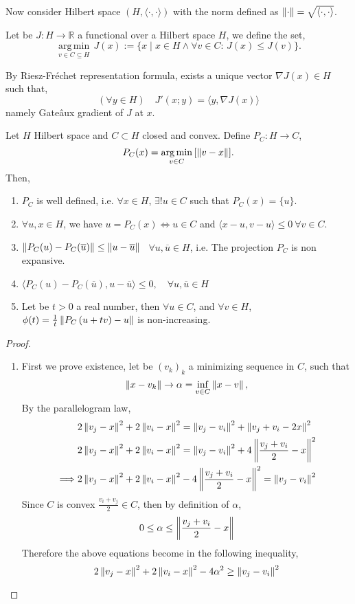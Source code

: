 Now consider Hilbert space $(H, \langle \cdot,\cdot \rangle)$ with the norm defined as $\left\lVert\cdot\right\rVert=\sqrt{\langle\cdot,\cdot\rangle}$.

Let be $J: H\rightarrow \mathbb{R}$ a functional over a Hilbert space $H$, we define the set,
\[
{\displaystyle {\underset {v\in C\subseteq H}{\operatorname {arg\,min} }}\,J(x):=\{x\mid x\in H \wedge \forall v\in C:\,J(x)\leq J(v)\}.}\]


By Riesz-Fr\'echet representation formula, exists a unique vector $\nabla J(x) \in H$ such that, 
\[
(\forall y \in H) \quad J'(x; y)=\langle y, \nabla J(x)\rangle
\]
namely Gate\^aux gradient of $J$ at $x$. 

\begin{lemma}
\label{lemma3. Projection}
Let $H$ Hilbert space and $C\subset H$ closed and convex. Define $P_C: H\rightarrow C$, \[P_C(x)={\displaystyle {\underset {v\in C}{\operatorname {arg\,min} }}\left[\left\lVert v-x\right\rVert\right]}.\]
Then,
\begin{enumerate}
	\item $P_C$ is well defined, i.e.  $\forall x \in H $, $\exists !u \in C$ such that $P_C(x)=\{u\}$.
	\item $\forall u,x\in H$, we have $u=P_C(x) \iff u\in C$  and  $\langle x-u, v-u\rangle\leq 0\ \forall v \in C$.
	\item $\left\lVert P_C(u)-P_C(\overline{u})\right\rVert\leq \left\lVert u-\overline{u}\right\rVert$ \ $\forall u, \overline{u} \in H$, i.e. The projection $P_C$ is non expansive.
	\item $\langle P_C(u)-P_C(\overline{u}), u-\overline{u}\rangle \leq 0, \quad \forall u, \overline{u}\in H$
	\item Let be $t>0$ a real number, then $\forall u \in C$, and $\forall v\in H$, $\phi(t)=\frac{1}{t}\left\lVert P_C\left(u+tv\right)-u\right\rVert$ is non-increasing.
\end{enumerate}
\begin{proof}
	\begin{enumerate}
		\item First we prove existence, let be $(v_k)_k$ a minimizing sequence in $C$, such that
		\[
			\left\lVert x-v_k\right\rVert\rightarrow \alpha=\inf_{v \in C}\left\lVert x-v\right\rVert,
		\]
		By the parallelogram law,
		\begin{align*}
			&2\left\lVert v_j-x\right\rVert^2+2\left\lVert v_i-x\right\rVert^2= \left\lVert v_j-v_i\right\rVert^2+\left\lVert v_j+v_i-2x\right\rVert^2 \\
			&2\left\lVert v_j-x\right\rVert^2+2\left\lVert v_i-x\right\rVert^2= \left\lVert v_j-v_i\right\rVert^2+4\left\lVert\frac{v_j+v_i}{2}-x\right\rVert^2\\
	\implies&2\left\lVert v_j-x\right\rVert^2+2\left\lVert v_i-x\right\rVert^2-4\left\lVert\frac{v_j+v_i}{2}-x\right\rVert^2=\left\lVert v_j-v_i\right\rVert^2
		\end{align*}
		Since $C$ is convex $\frac{v_i+v_j}{2} \in C$, then by definition of $\alpha$,
		\[
		0\leq \alpha \leq \left\lVert\frac{v_j+v_i}{2}-x\right\rVert
		\]  
		Therefore the above equations become in the following inequality,
		\[
		2\left\lVert v_j-x\right\rVert^2+2\left\lVert v_i-x\right\rVert^2-4\alpha^2\geq \left\lVert v_j-v_i\right\rVert^2
		\]
		

\end{enumerate}
\end{proof}
\end{lemma}
